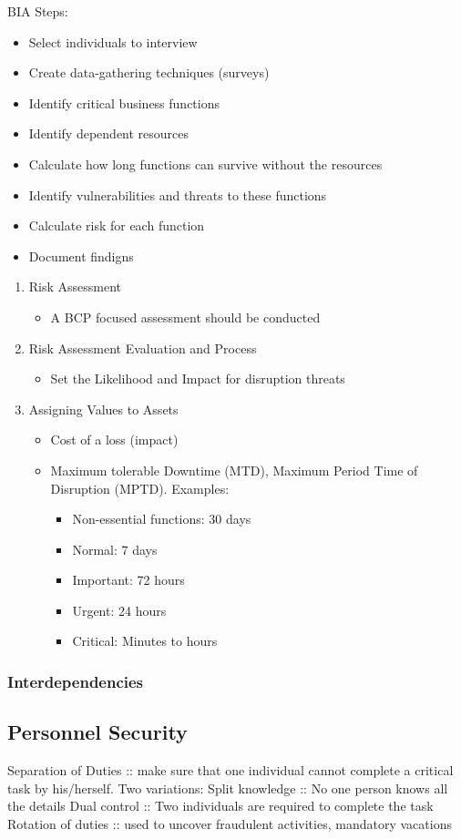 \documentclass[11pt]{article}
\begin{document}
BIA Steps:
\begin{itemize}
\item Select individuals to interview
\item Create data-gathering techniques (surveys)
\item Identify critical business functions
\item Identify dependent resources
\item Calculate how long functions can survive without the resources
\item Identify vulnerabilities and threats to these functions
\item Calculate risk for each function
\item Document findigns
\end{itemize}
\begin{enumerate}
\item Risk Assessment
\label{sec:orge406e2e}
\begin{itemize}
\item A BCP focused assessment should be conducted
\end{itemize}
\item Risk Assessment Evaluation and Process
\label{sec:org196d9ca}
\begin{itemize}
\item Set the Likelihood and Impact for disruption threats
\end{itemize}
\item Assigning Values to Assets
\label{sec:org686f995}
\begin{itemize}
\item Cost of a loss (impact)
\item Maximum tolerable Downtime (MTD), Maximum Period Time of Disruption (MPTD). Examples:
\begin{itemize}
\item Non-essential functions: 30 days
\item Normal: 7 days
\item Important: 72 hours
\item Urgent: 24 hours
\item Critical: Minutes to hours
\end{itemize}
\end{itemize}
\end{enumerate}
\subsubsection{Interdependencies}
\label{sec:org67c0a36}
\subsection{Personnel Security}
\label{sec:org50a2ca0}
Separation of Duties :: make sure that one individual cannot complete a critical task by his/herself. Two variations:
Split knowledge :: No one person knows all the details
Dual control :: Two individuals are required to complete the task
Rotation of duties :: used to uncover fraudulent activities, mandatory vacations
\end{document}
